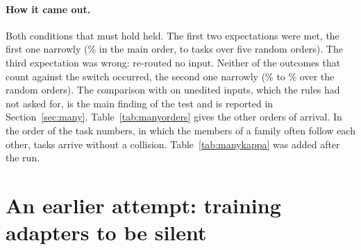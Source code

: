 \paragraph{How it came out.} Both conditions that must hold held. The first two expectations were
met, the first one narrowly (\ManyCleanPct{}\% in the main order, \ManyCleanLow{} to
\ManyCleanHigh{} tasks over five random orders). The third expectation was wrong: \nearest{}
re-routed no input. Neither of the outcomes that count against the switch occurred, the second one
narrowly (\ManyCertRightPctLow{}\% to \ManyCertRightPctHigh{}\% over the random orders). The
comparison with \nearest{} on unedited inputs, which the rules had not asked for, is the main
finding of the test and is reported in Section~\ref{sec:many}. Table~\ref{tab:manyorders} gives the
other orders of arrival. In the order of the task numbers, in which the members of a family often
follow each other, \ManyNumericClean{} tasks arrive without a collision. Table~\ref{tab:manykappa}
was added after the run.

\begin{table}[h]
  \caption{The test on \ManyTasks{} tasks for six orders of arrival, after all tasks.}
  \label{tab:manyorders}
  \centering
  \footnotesize
  \setlength{\tabcolsep}{2.5pt}
  
\end{table}

\begin{table}[h]
  \caption{Other radius factors on the \ManyTasks{} tasks (main order). Added after the run; the
  method uses $\kappa = 0.5$.}
  \label{tab:manykappa}
  \centering
  \small
  \setlength{\tabcolsep}{4pt}
  
\end{table}

\begin{table}[h]
  \caption{Examples of collisions (main order). Above the line: the six colliding tasks whose
  definition is least like that of the task they collide with. Below: two members of the
  largest family and two tasks with the same definition text as an older task. ``Common words'':
  words shared by the two definitions, as a share of the longer one.}
  \label{tab:manyexamples}
  \centering
  \scriptsize
  \setlength{\tabcolsep}{3pt}
  
\end{table}





\FloatBarrier
\section{An earlier attempt: training adapters to be silent}
\label{app:silence}

